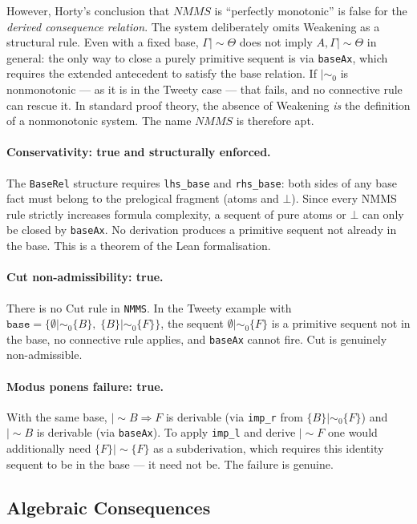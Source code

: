 \documentclass[a4paper,11pt]{report}
\newcommand{\ms}{\mathrel{\mid\!\sim}}
\newcommand{\mszero}{\mathrel{\mid\!\sim_{0}}}
\begin{document}
However, Horty's conclusion that $\mathit{NMMS}$ is ``perfectly monotonic'' is false
for the \emph{derived consequence relation}. The system deliberately omits Weakening as a
structural rule. Even with a fixed base, $\Gamma \ms \Theta$ does not imply
$A, \Gamma \ms \Theta$ in general: the only way to close a purely primitive sequent is
via \texttt{baseAx}, which requires the extended antecedent to satisfy the base relation.
If $\mszero$ is nonmonotonic --- as it is in the Tweety case --- that fails, and no
connective rule can rescue it.
In standard proof theory, the absence of Weakening \emph{is} the definition of a
nonmonotonic system. The name $\mathit{NMMS}$ is therefore apt.

\paragraph{Conservativity: true and structurally enforced.}
The \texttt{BaseRel} structure requires \texttt{lhs\_base} and \texttt{rhs\_base}: both
sides of any base fact must belong to the prelogical fragment (atoms and $\bot$).
Since every NMMS rule strictly increases formula complexity, a sequent of pure atoms or
$\bot$ can only be closed by \texttt{baseAx}. No derivation produces a primitive sequent
not already in the base. This is a theorem of the Lean formalisation.

\paragraph{Cut non-admissibility: true.}
There is no Cut rule in \texttt{NMMS}. In the Tweety example with
$\mathtt{base} = \{\emptyset \mszero \{B\},\; \{B\} \mszero \{F\}\}$,
the sequent $\emptyset \mszero \{F\}$ is a primitive sequent not in the base,
no connective rule applies, and \texttt{baseAx} cannot fire. Cut is genuinely
non-admissible.

\paragraph{Modus ponens failure: true.}
With the same base, $\ms B \Rightarrow F$ is derivable (via \texttt{imp\_r} from
$\{B\} \mszero \{F\}$) and $\ms B$ is derivable (via \texttt{baseAx}).
To apply \texttt{imp\_l} and derive $\ms F$ one would additionally need $\{F\} \ms \{F\}$
as a subderivation, which requires this identity sequent to be in the base --- it need not
be. The failure is genuine.

\subsection*{Algebraic Consequences}
\end{document}

